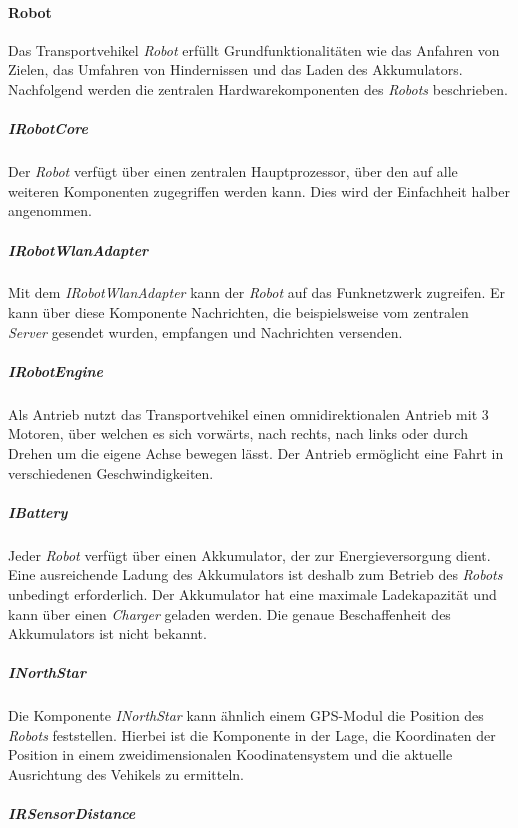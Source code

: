     \paragraph{Robot}\label{robot}

    Das Transportvehikel \emph{Robot} erfüllt Grundfunktionalitäten wie das
    Anfahren von Zielen, das Umfahren von Hindernissen und das Laden des
    Akkumulators. Nachfolgend werden die zentralen Hardwarekomponenten des
    \emph{Robots} beschrieben.

    \subparagraph{IRobotCore}\label{irobotcore}

    Der \emph{Robot} verfügt über einen zentralen Hauptprozessor, über den
    auf alle weiteren Komponenten zugegriffen werden kann. Dies wird der
    Einfachheit halber angenommen.

    \subparagraph{IRobotWlanAdapter}\label{irobotwlanadapter}

    Mit dem \emph{IRobotWlanAdapter} kann der \emph{Robot} auf das Funknetzwerk
    zugreifen. Er kann über diese Komponente Nachrichten, die beispielsweise vom
    zentralen \emph{Server} gesendet wurden, empfangen und Nachrichten versenden.

    \subparagraph{IRobotEngine}\label{irobotengine}

    Als Antrieb nutzt das Transportvehikel einen omnidirektionalen Antrieb
    mit 3 Motoren, über welchen es sich vorwärts, nach rechts, nach links
    oder durch Drehen um die eigene Achse bewegen lässt. Der Antrieb
    ermöglicht eine Fahrt in verschiedenen Geschwindigkeiten.

    \subparagraph{IBattery}\label{ibattery}

    Jeder \emph{Robot} verfügt über einen Akkumulator, der zur
    Energieversorgung dient. Eine ausreichende Ladung des Akkumulators ist
    deshalb zum Betrieb des \emph{Robots} unbedingt erforderlich. Der
    Akkumulator hat eine maximale Ladekapazität und kann über einen
    \emph{Charger} geladen werden. Die genaue Beschaffenheit des
    Akkumulators ist nicht bekannt.

    \subparagraph{INorthStar}\label{inorthstar}

    Die Komponente \emph{INorthStar} kann ähnlich einem GPS-Modul die
    Position des \emph{Robots} feststellen. Hierbei ist die Komponente in
    der Lage, die Koordinaten der Position in einem zweidimensionalen
    Koodinatensystem und die aktuelle Ausrichtung des Vehikels zu ermitteln.

    \subparagraph{IRSensorDistance}\label{irsensordistance}

